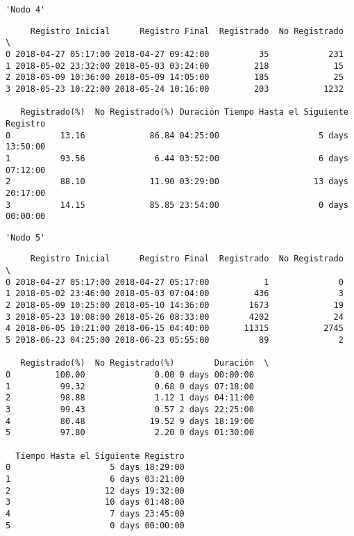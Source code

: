 \documentclass[11pt]{article}
\begin{document}
    
    
    \begin{verbatim}
'Nodo 4'
    \end{verbatim}

    
    
    \begin{verbatim}
     Registro Inicial      Registro Final  Registrado  No Registrado  \
0 2018-04-27 05:17:00 2018-04-27 09:42:00          35            231   
1 2018-05-02 23:32:00 2018-05-03 03:24:00         218             15   
2 2018-05-09 10:36:00 2018-05-09 14:05:00         185             25   
3 2018-05-23 10:22:00 2018-05-24 10:16:00         203           1232   

   Registrado(%)  No Registrado(%) Duración Tiempo Hasta el Siguiente Registro  
0          13.16             86.84 04:25:00                    5 days 13:50:00  
1          93.56              6.44 03:52:00                    6 days 07:12:00  
2          88.10             11.90 03:29:00                   13 days 20:17:00  
3          14.15             85.85 23:54:00                    0 days 00:00:00  
    \end{verbatim}

    
    
    \begin{verbatim}
'Nodo 5'
    \end{verbatim}

    
    
    \begin{verbatim}
     Registro Inicial      Registro Final  Registrado  No Registrado  \
0 2018-04-27 05:17:00 2018-04-27 05:17:00           1              0   
1 2018-05-02 23:46:00 2018-05-03 07:04:00         436              3   
2 2018-05-09 10:25:00 2018-05-10 14:36:00        1673             19   
3 2018-05-23 10:08:00 2018-05-26 08:33:00        4202             24   
4 2018-06-05 10:21:00 2018-06-15 04:40:00       11315           2745   
5 2018-06-23 04:25:00 2018-06-23 05:55:00          89              2   

   Registrado(%)  No Registrado(%)        Duración  \
0         100.00              0.00 0 days 00:00:00   
1          99.32              0.68 0 days 07:18:00   
2          98.88              1.12 1 days 04:11:00   
3          99.43              0.57 2 days 22:25:00   
4          80.48             19.52 9 days 18:19:00   
5          97.80              2.20 0 days 01:30:00   

  Tiempo Hasta el Siguiente Registro  
0                    5 days 18:29:00  
1                    6 days 03:21:00  
2                   12 days 19:32:00  
3                   10 days 01:48:00  
4                    7 days 23:45:00  
5                    0 days 00:00:00  
    \end{verbatim}
\end{document}
